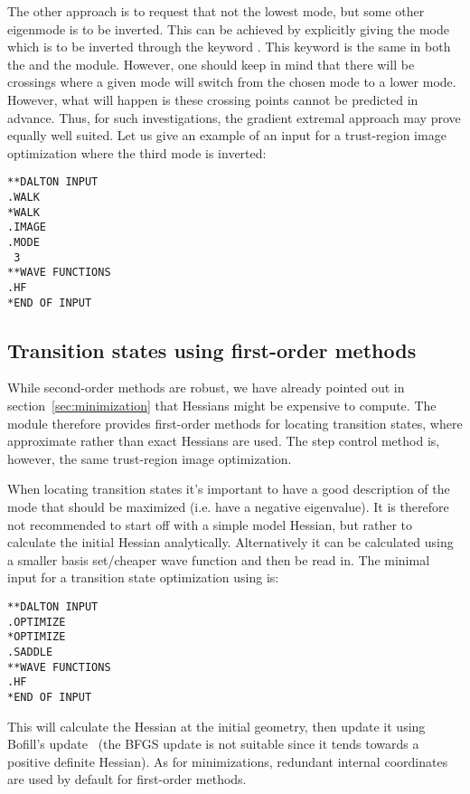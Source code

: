 The other approach is to request
that not the lowest mode, but some other eigenmode is to be inverted.
This can be achieved by explicitly giving the mode which is to be
inverted through the keyword . This keyword is the same in
both the  and the  module. However, one
should keep in mind that there will be crossings where a given mode
will switch from the chosen mode to a lower mode. However, what will happen
is these crossing points cannot be predicted in advance. Thus, for such
investigations, the gradient extremal approach may prove equally well
suited. Let us give an example of an input for a trust-region
image optimization where the third mode is inverted:

\begin{verbatim}
**DALTON INPUT
.WALK
*WALK
.IMAGE
.MODE
 3
**WAVE FUNCTIONS
.HF
*END OF INPUT
\end{verbatim}

\subsection{Transition states using first-order
methods}\label{sec:saddle1stord}

While second-order methods are robust, we have already pointed out
in section~\ref{sec:minimization} that Hessians might be expensive to
compute. The  module therefore provides first-order
methods for locating transition states, where approximate rather than
exact Hessians are used. The step control method is, however, the same
trust-region image optimization.

When locating transition states it's important to have a good
description of the mode that should be maximized (i.e. have a negative
eigenvalue). It is therefore not recommended to start off with a
simple model Hessian, but rather to calculate the initial Hessian
analytically. Alternatively it can be calculated using a smaller basis
set/cheaper wave function and then be read in. The minimal input for a
transition state optimization using  is:
\begin{verbatim}
**DALTON INPUT
.OPTIMIZE
*OPTIMIZE
.SADDLE
**WAVE FUNCTIONS
.HF
*END OF INPUT
\end{verbatim}
This will calculate the Hessian at the initial geometry, then update
it using Bofill's
update~\cite{jmbjcc15}
(the BFGS update is not suitable since
it tends towards a positive definite Hessian). As for minimizations,
redundant internal coordinates are used by default for first-order
methods.

